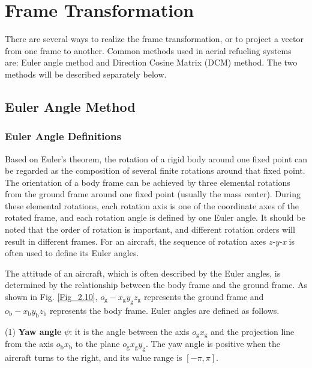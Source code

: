 \section{Frame Transformation}

There are several ways to realize the frame transformation, or to
project a vector from one frame to another. Common methods used in
aerial refueling systems are: Euler angle method and Direction Cosine
Matrix (DCM) method. The two methods will be described separately
below.

\subsection{Euler Angle Method}

\subsubsection{Euler Angle Definitions}

Based on Euler\textquoteright s theorem, the rotation of a rigid body
around one fixed point can be regarded as the composition of several
finite rotations around that fixed point. The orientation of a body
frame can be achieved by three elemental rotations from the ground
frame around one fixed point (usually the mass center). During these
elemental rotations, each rotation axis is one of the coordinate axes
of the rotated frame, and each rotation angle is defined by one Euler
angle. It should be noted that the order of rotation is important,
and different rotation orders will result in different frames. For
an aircraft, the sequence of rotation axes \textit{z-y-x} is often
used to define its Euler angles.

The attitude of an aircraft, which is often described by the Euler
angles, is determined by the relationship between the body frame and
the ground frame. As shown in Fig. \ref{Fig_2.10}, ${{o}_{\text{g}}}-{{x}_{\text{g}}}{{y}_{\text{g}}}{{z}_{\text{g}}}$
represents the ground frame and ${{o}_{\text{b}}}-{{x}_{\text{b}}}{{y}_{\text{b}}}{{z}_{\text{b}}}$
represents the body frame. Euler angles are defined as follows.

(1) \textbf{Yaw angle} $\psi$: it is the angle between the axis ${{o}_{\text{g}}}{{x}_{\text{g}}}$
and the projection line from the axis ${{o}_{\text{b}}}{{x}_{\text{b}}}$
to the plane ${{o}_{\text{g}}}{{x}_{\text{g}}}{{y}_{\text{g}}}$.
The yaw angle is positive when the aircraft turns to the right, and
its value range is $\left[-\pi,\pi\right]$. 


